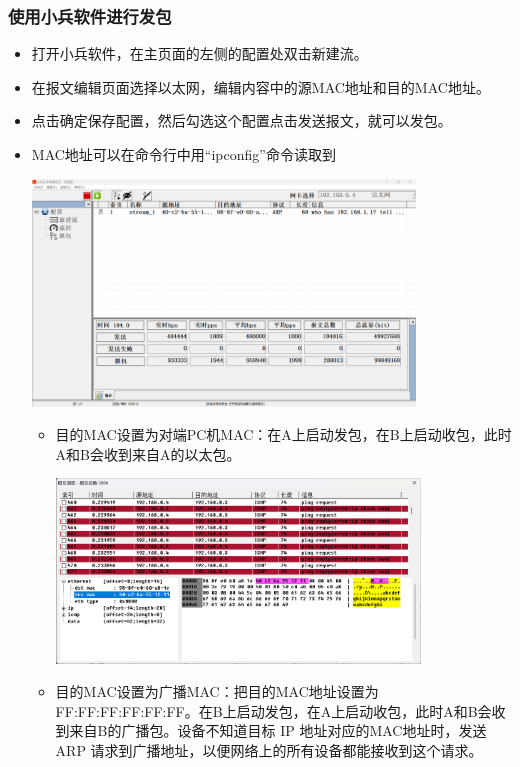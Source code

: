 \documentclass{article}
\begin{document}
\subsubsection{使用小兵软件进行发包}
\begin{itemize}
    \item 打开小兵软件，在主页面的左侧的配置处双击新建流。
    \item 在报文编辑页面选择以太网，编辑内容中的源MAC地址和目的MAC地址。
    \item 点击确定保存配置，然后勾选这个配置点击发送报文，就可以发包。
    \item MAC地址可以在命令行中用“ipconfig”命令读取到
    
    \begin{center}
        \includegraphics[width=0.8\textwidth]{2_2_images/4.png}
    \end{center}
    
    \begin{itemize}
        \item 目的MAC设置为对端PC机MAC：在A上启动发包，在B上启动收包，此时A和B会收到来自A的以太包。
        
        \begin{center}
            \includegraphics[width=0.8\textwidth]{2_2_images/8.png}
        \end{center}
        
        \item 目的MAC设置为广播MAC：把目的MAC地址设置为FF:FF:FF:FF:FF:FF。在B上启动发包，在A上启动收包，此时A和B会收到来自B的广播包。设备不知道目标 IP 地址对应的MAC地址时，发送 ARP 请求到广播地址，以便网络上的所有设备都能接收到这个请求。
        

\end{itemize}
\end{itemize}
\end{document}
